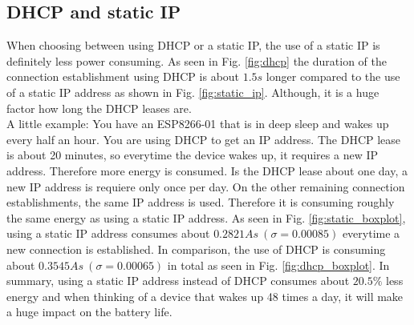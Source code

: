 \subsection{DHCP and static IP}
When choosing between using DHCP or a static IP, the use of a static IP is definitely less power consuming.
As seen in Fig. \ref{fig:dhcp} the duration of the connection establishment using DHCP is about $1.5 s$ longer compared to the use of a static IP address as shown in Fig. \ref{fig:static_ip}.
Although, it is a huge factor how long the DHCP leases are.\\
A little example: You have an ESP8266-01 that is in deep sleep and wakes up every half an hour. You are using DHCP to get an IP address.
The DHCP lease is about 20 minutes, so everytime the device wakes up, it requires a new IP address. Therefore more energy is consumed.
Is the DHCP lease about one day, a new IP address is requiere only once per day. On the other remaining connection establishments, the same IP address is used. Therefore it is consuming roughly the same energy as using a static IP address.
As seen in Fig. \ref{fig:static_boxplot}, using a static IP address consumes about $0.2821 As\ (\sigma = 0.00085)$ everytime a new connection is established.
In comparison, the use of DHCP is consuming about $0.3545 As\ (\sigma = 0.00065)$ in total as seen in Fig. \ref{fig:dhcp_boxplot}.
In summary, using a static IP address instead of DHCP consumes about $20.5\%$ less energy and when thinking of a device that wakes up 48 times a day, it will make a huge impact on the battery life.